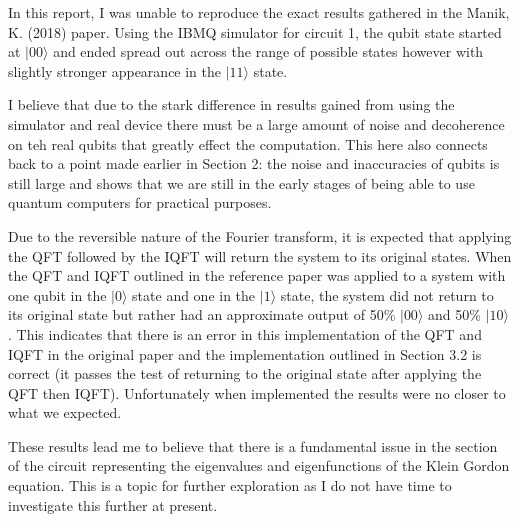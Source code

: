 \documentclass{article}
\begin{document}
In this report, I was unable to reproduce the exact results gathered in the Manik, K. (2018) \cite{manik} paper. Using the IBMQ simulator for circuit 1, the qubit state started at $|00\rangle$ and ended spread out across the range of possible states however with slightly stronger appearance in the $|11\rangle$ state. 

I believe that due to the stark difference in results gained from using the simulator and real device there must be a large amount of noise and decoherence on teh real qubits that greatly effect the computation. This here also connects back to a point made earlier in Section 2: the noise and inaccuracies of qubits is still large and shows that we are still in the early stages of being able to use quantum computers for practical purposes.

Due to the reversible nature of the Fourier transform, it is expected that applying the QFT followed by the IQFT will return the system to its original states. When the QFT and IQFT outlined in the reference paper \cite{manik} was applied to a system with one qubit in the $|0\rangle$ state and one in the $|1\rangle$ state, the system did not return to its original state but rather had an approximate output of 50\% $|00\rangle$ and 50\% $|10\rangle$. This indicates that there is an error in this implementation of the QFT and IQFT in the original paper and the implementation outlined in Section 3.2 is correct (it passes the test of returning to the original state after applying the QFT then IQFT). Unfortunately when implemented the results were no closer to what we expected. 

These results lead me to believe that there is a fundamental issue in the section of the circuit representing the eigenvalues and eigenfunctions of the Klein Gordon equation. This is a topic for further exploration as I do not have time to investigate this further at present.



\end{document}
